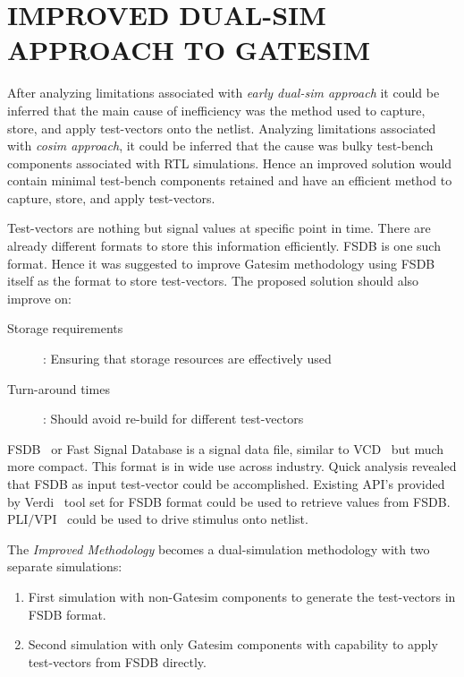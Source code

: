 \chapter{IMPROVED DUAL-SIM APPROACH TO GATESIM}
\label{chap:dualsim.tex}
After analyzing limitations associated with \emph{early dual-sim approach} it could be inferred that the main cause of inefficiency was the method used to capture, store, and apply test-vectors onto the netlist. Analyzing limitations associated with \emph{cosim approach}, it could be inferred that the cause was bulky test-bench components associated with RTL simulations. Hence an improved solution would contain minimal test-bench components retained and have an efficient method to capture, store, and apply test-vectors. 

Test-vectors are nothing but signal values at specific point in time. There are already different formats to store this information efficiently. FSDB  is one such format. Hence it was suggested to improve Gatesim methodology using FSDB itself as the format to store test-vectors. The proposed solution should also improve on:

\begin{description}
	\item[Storage requirements]: Ensuring that storage resources are effectively used
	\item[Turn-around times]: Should avoid re-build for different test-vectors
\end{description}

FSDB~\citep{SS:Verdi} or Fast Signal Database is a signal data file, similar to VCD~\citep{ieee:v:2005}  but much more compact. This format is in wide use across industry. Quick analysis revealed that FSDB as input test-vector could be accomplished. Existing API's provided by Verdi~\citep{SS:Verdi} tool set for FSDB format could be used to retrieve values from FSDB. PLI$/$VPI~\citep{ieee:v:2005} could be used to drive stimulus onto netlist.


The {\it Improved Methodology} becomes a dual-simulation methodology with two separate simulations:
\begin{enumerate}
	\item First simulation with non-Gatesim components to generate the test-vectors in FSDB format.
	\item Second simulation with only Gatesim components with capability to apply test-vectors from FSDB directly.
\end{enumerate}



